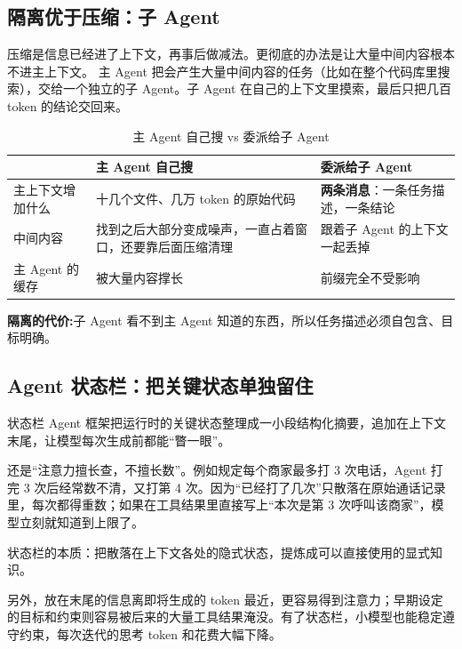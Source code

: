 \subsection{隔离优于压缩：子 Agent}
压缩是信息已经进了上下文，再事后做减法。更彻底的办法是让大量中间内容根本不进主上下文。
主 Agent 把会产生大量中间内容的任务（比如在整个代码库里搜索），交给一个独立的子 Agent。子 Agent 在自己的上下文里摸索，最后只把几百 token 的结论交回来。
\begin{table}[H]
\centering
\caption{主 Agent 自己搜 vs 委派给子 Agent}
\label{tab:subagent-isolation}
\begin{tabular}{p{3.0cm} p{6.0cm} p{5.6cm}}
  \toprule
   & \textbf{主 Agent 自己搜} & \textbf{委派给子 Agent} \\
  \midrule
  主上下文增加什么 &
    十几个文件、几万 token 的原始代码 &
    \textbf{两条消息}：一条任务描述，一条结论 \\
  \addlinespace
  中间内容 &
    找到之后大部分变成噪声，一直占着窗口，还要靠后面压缩清理 &
    跟着子 Agent 的上下文一起丢掉 \\
  \addlinespace
  主 Agent 的缓存 &
    被大量内容撑长 &
    前缀完全不受影响 \\
  \bottomrule
\end{tabular}
\end{table}
\textbf{隔离的代价:}子 Agent 看不到主 Agent 知道的东西，所以任务描述必须自包含、目标明确。
\subsection{Agent 状态栏：把关键状态单独留住}
\begin{definition}{状态栏}
  Agent 框架把运行时的关键状态整理成一小段结构化摘要，追加在上下文末尾，让模型每次生成前都能“瞥一眼”。
\end{definition}

还是“注意力擅长查，不擅长数”。例如规定每个商家最多打 3 次电话，Agent 打完 3 次后经常数不清，又打第 4 次。因为“已经打了几次”只散落在原始通话记录里，每次都得重数；如果在工具结果里直接写上“本次是第 3 次呼叫该商家”，模型立刻就知道到上限了。
\begin{tcolorbox}[enhanced, sharp corners, boxrule=0pt, frame hidden,
                  borderline west={3pt}{0pt}{structurecolor},
                  colback=structurecolor!5]
状态栏的本质：把散落在上下文各处的隐式状态，提炼成可以直接使用的显式知识。
\end{tcolorbox}
另外，放在末尾的信息离即将生成的 token 最近，更容易得到注意力；早期设定的目标和约束则容易被后来的大量工具结果淹没。有了状态栏，小模型也能稳定遵守约束，每次迭代的思考 token 和花费大幅下降。

